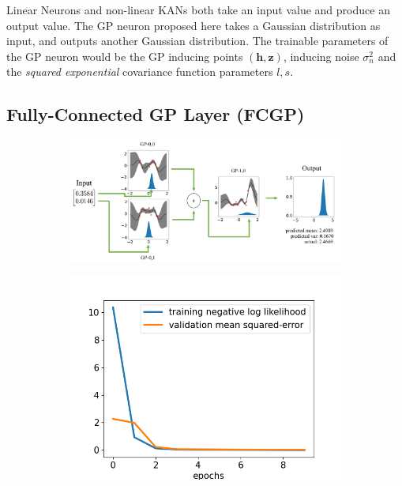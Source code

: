 \documentclass{article}
\begin{document}
Linear Neurons \cite{ANN} and non-linear KANs \cite{liu2024kan} both take an input value and produce an output value. The GP neuron proposed here takes a Gaussian distribution as input, and outputs another Gaussian distribution. The trainable parameters of the GP neuron would be the GP inducing points $(\boldsymbol{h}, \boldsymbol{z})$, inducing noise $\sigma_n^2$ and the \textit{squared exponential} covariance function parameters $l, s$.

\subsection{Fully-Connected GP Layer (FCGP)}


\begin{figure}[t]
    \centering
    \begin{subfigure}[b]{0.95\columnwidth}
        \includegraphics[width=\textwidth]{simple_function.png}
        \caption{}
    \end{subfigure}
    \hfill
    \begin{subfigure}[b]{0.4\columnwidth}
        \includegraphics[width=\textwidth]{simple_function_training.png}
        \caption{}
    \end{subfigure}


\end{figure}
\end{document}
